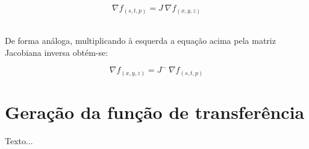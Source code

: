 \begin{equation}\label{eq:cadeia_jacob}
	\nabla f_{(s, t, p)} = J\ \nabla f_{(x, y, z)}
\end{equation} \

	De forma análoga, multiplicando à esquerda a equação acima pela matriz Jacobiana inversa obtém-se:
	
\begin{equation}\label{eq:cadeia_jacob_inv}
	\nabla f_{(x, y, z)} = J^{-}\ \nabla f_{(s, t, p)}
\end{equation}

\section{Geração da função de transferência}
\label{sec:my.tf}
	Texto...